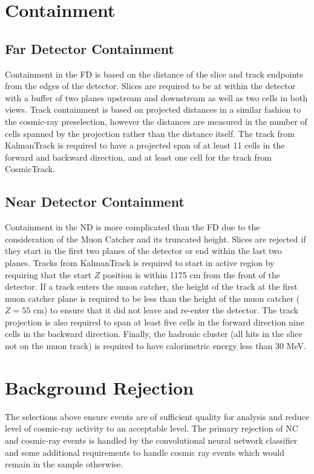 \section{Containment}

\subsection{Far Detector Containment}

Containment in the FD is based on the distance of the slice and track
endpoints from the edges of the detector.
Slices are required to be at within the detector with a buffer of two
planes upstream and downstream as well as two cells in both views.
Track containment is based on projected distances in a similar fashion
to the cosmic-ray preselection, however the distances are measured in
the number of cells spanned by the projection rather than the distance itself.
The track from KalmanTrack is required to have a projected span of at least
11 cells in the forward and backward direction, and at least one cell
for the track from CosmicTrack.

\subsection{Near Detector Containment}

Containment in the ND is more complicated than the FD due to the consideration
of the Muon Catcher and its truncated height.
Slices are rejected if they start in the first two planes of the detector or
end within the last two planes.
Tracks from KalmanTrack is required to start in active region by requiring that
the start $Z$ position is within 1175 cm from the front of the detector.
If a track enters the muon catcher, the height of the track
at the first muon catcher plane is required to be less than the height of
the muon catcher ($Z = 55$ cm) to ensure that it did not leave and re-enter
the detector.
The track projection is also required to span at least five cells in the
forward direction nine cells in the backward direction.
Finally, the hadronic cluster (all hits in the slice not on the muon track)
is required to have calorimetric energy less than 30 MeV.


\section{Background Rejection}

The selections above ensure events are of sufficient quality for analysis
and reduce level of cosmic-ray activity to an acceptable level.
The primary rejection of NC and cosmic-ray events is handled by
the convolutional neural network classifier and some additional requirements
to handle cosmic ray events which would remain in the sample otherwise.


